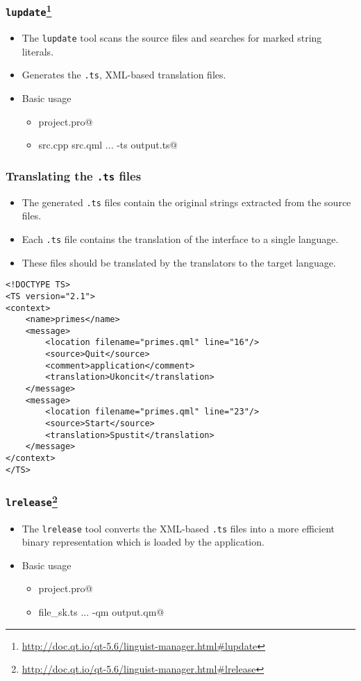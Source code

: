 \begin{frame}[fragile]
  \frametitle{\texttt{lupdate}\footnote
   {\url{http://doc.qt.io/qt-5.6/linguist-manager.html\#lupdate}}}
  \begin{itemize}
    \item The \texttt{lupdate} tool scans the source files and searches for
      marked string literals.
    \item Generates the \texttt{.ts}, XML-based translation files.
    \item Basic usage
    \begin{itemize}
      \item \verb@lupdate project.pro@
      \item \verb@lupdate src.cpp src.qml ... -ts output.ts@
    \end{itemize}
  \end{itemize}
\end{frame}

\begin{frame}[fragile]
  \frametitle{Translating the \texttt{.ts} files}
  \small
  \begin{itemize}
    \item The generated \texttt{.ts} files contain the original strings extracted
      from the source files.
    \item Each \texttt{.ts} file contains the translation of the interface
      to a single language.
    \item These files should be translated by the translators to the target
      language.
  \end{itemize}
  \begin{lstlisting}[basicstyle=\tiny\ttfamily]
<!DOCTYPE TS>
<TS version="2.1">
<context>
    <name>primes</name>
    <message>
        <location filename="primes.qml" line="16"/>
        <source>Quit</source>
        <comment>application</comment>
        <translation>Ukoncit</translation>
    </message>
    <message>
        <location filename="primes.qml" line="23"/>
        <source>Start</source>
        <translation>Spustit</translation>
    </message>
</context>
</TS>
  \end{lstlisting}
\end{frame}

\begin{frame}[fragile]
  \frametitle{\texttt{lrelease}\footnote
   {\url{http://doc.qt.io/qt-5.6/linguist-manager.html\#lrelease}}}
  \begin{itemize}
    \item The \texttt{lrelease} tool converts the XML-based \texttt{.ts} files
      into a more efficient binary representation which is loaded by the
      application.
    \item Basic usage
    \begin{itemize}
      \item \verb@lrelease project.pro@
      \item \verb@lrelease file_sk.ts  ... -qm output.qm@
    \end{itemize}
  \end{itemize}
\end{frame}

